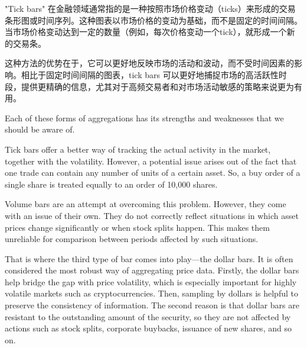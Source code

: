 "Tick bars" 在金融领域通常指的是一种按照市场价格变动（ticks）来形成的交易条形图或时间序列。这种图表以市场价格的变动为基础，而不是固定的时间间隔。当市场价格变动达到一定的数量（例如，每次价格变动一个tick），就形成一个新的交易条。

这种方法的优势在于，它可以更好地反映市场的活动和波动，而不受时间因素的影响。相比于固定时间间隔的图表，tick bars 可以更好地捕捉市场的高活跃性时段，提供更精确的信息，尤其对于高频交易者和对市场活动敏感的策略来说更为有用。

Each of these forms of aggregations has its strengths and weaknesses that we should be aware of.

Tick bars offer a better way of tracking the actual activity in the market, together with the volatility. However, a potential issue arises out of the fact that one trade can contain any number of units of a certain asset. So, a buy order of a single share is treated equally to an order of 10,000 shares.

Volume bars are an attempt at overcoming this problem. However, they come with an issue of their own. They do not correctly reflect situations in which asset prices change significantly or when stock splits happen. This makes them unreliable for comparison between periods affected by such situations.

That is where the third type of bar comes into play—the dollar bars. It is often considered the most robust way of aggregating price data. Firstly, the dollar bars help bridge the gap with price volatility, which is especially important for highly volatile markets such as cryptocurrencies. Then, sampling by dollars is helpful to preserve the consistency of information. The second reason is that dollar bars are resistant to the outstanding amount of the security, so they are not affected by actions such as stock splits, corporate buybacks, issuance of new shares, and so on.